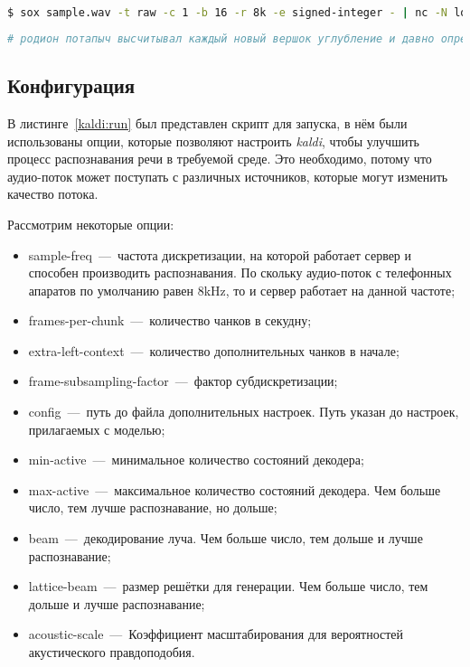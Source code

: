 \begin{lstlisting}[caption={Передача аудио-файла на распознавание речи},label={kaldi:run:check},language=bash]
$ sox sample.wav -t raw -c 1 -b 16 -r 8k -e signed-integer - | nc -N localhost 5050
\end{lstlisting}

\begin{lstlisting}[caption={Результат работы сервера распознавания речи}, label={kaldi:run:res},language=bash]
# родион потапыч высчитывал каждый новый вершок углубление и давно определил про себя
\end{lstlisting}

\subsection{Конфигурация}

В листинге~\ref{kaldi:run} был представлен скрипт для запуска, в нём были
использованы опции, которые позволяют настроить \textit{kaldi}, чтобы улучшить
процесс распознавания речи в требуемой среде. Это необходимо, потому что
аудио-поток может поступать с различных источников, которые могут изменить качество
потока.

Рассмотрим некоторые опции:
\begin{itemize} \label{kaldi:options}
    \item sample-freq~---~частота дискретизации, на которой работает сервер и способен производить распознавания.
        По скольку аудио-поток с телефонных апаратов по умолчанию равен 8kHz, то и сервер работает на данной частоте;
    \item frames-per-chunk~---~количество чанков в секудну;
    \item extra-left-context~---~количество дополнительных чанков в начале;
    \item frame-subsampling-factor~---~фактор субдискретизации;
    \item config~---~путь до файла дополнительных настроек. Путь указан до настроек, прилагаемых с моделью;
    \item min-active~---~минимальное количество состояний декодера;
    \item max-active~---~максимальное количество состояний декодера. Чем больше число, тем лучше распознавание, но дольше;
    \item beam~---~декодирование луча. Чем больше число, тем дольше и лучше распознавание;
    \item lattice-beam~---~размер решётки для генерации. Чем больше число, тем дольше и лучше распознавание;
    \item acoustic-scale~---~Коэффициент масштабирования для вероятностей акустического правдоподобия.
\end{itemize}

